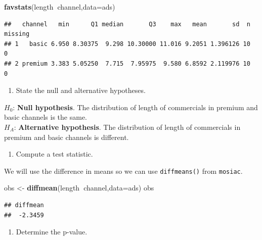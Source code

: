 \documentclass[
]{book}
\newenvironment{Shaded}{\begin{snugshade}}{\end{snugshade}}
\newcommand{\DataTypeTok}[1]{\textcolor[rgb]{0.13,0.29,0.53}{#1}}
\newcommand{\KeywordTok}[1]{\textcolor[rgb]{0.13,0.29,0.53}{\textbf{#1}}}
\newcommand{\NormalTok}[1]{#1}
\newcommand{\OperatorTok}[1]{\textcolor[rgb]{0.81,0.36,0.00}{\textbf{#1}}}
\newcommand{\StringTok}[1]{\textcolor[rgb]{0.31,0.60,0.02}{#1}}
\providecommand{\tightlist}{%
  \setlength{\itemsep}{0pt}\setlength{\parskip}{0pt}}
\begin{document}
\begin{Shaded}
\begin{Highlighting}[]
\KeywordTok{favstats}\NormalTok{(length}\OperatorTok{~}\NormalTok{channel,}\DataTypeTok{data=}\NormalTok{ads)}
\end{Highlighting}
\end{Shaded}

\begin{verbatim}
##   channel   min      Q1 median       Q3    max   mean       sd  n missing
## 1   basic 6.950 8.30375  9.298 10.30000 11.016 9.2051 1.396126 10       0
## 2 premium 3.383 5.05250  7.715  7.95975  9.580 6.8592 2.119976 10       0
\end{verbatim}

\begin{enumerate}
\def\labelenumi{\arabic{enumi}.}
\tightlist
\item
  State the null and alternative hypotheses.
\end{enumerate}

\(H_0\): \textbf{Null hypothesis}. The distribution of length of commercials in premium and basic channels is the same.\\
\(H_A\): \textbf{Alternative hypothesis}. The distribution of length of commercials in premium and basic channels is different.

\begin{enumerate}
\def\labelenumi{\arabic{enumi}.}
\setcounter{enumi}{1}
\tightlist
\item
  Compute a test statistic.
\end{enumerate}

We will use the difference in means so we can use \texttt{diffmeans()} from \texttt{mosiac}.

\begin{Shaded}
\begin{Highlighting}[]
\NormalTok{obs <-}\StringTok{ }\KeywordTok{diffmean}\NormalTok{(length}\OperatorTok{~}\NormalTok{channel,}\DataTypeTok{data=}\NormalTok{ads)}
\NormalTok{obs}
\end{Highlighting}
\end{Shaded}

\begin{verbatim}
## diffmean 
##  -2.3459
\end{verbatim}

\begin{enumerate}
\def\labelenumi{\arabic{enumi}.}
\setcounter{enumi}{2}
\tightlist
\item
  Determine the p-value.
\end{enumerate}
\end{document}

